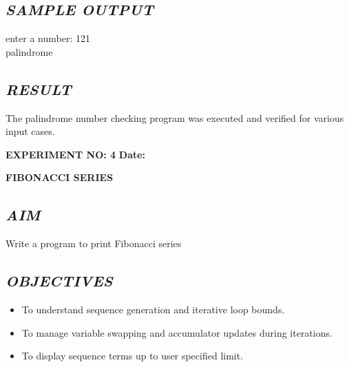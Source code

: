 \documentclass[11pt,a4paper]{article}
\begin{document}
\subsection*{\textit{SAMPLE OUTPUT}}
\begin{tcolorbox}[colback=black!85,colframe=navyblue,title=\textbf{Terminal Output},coltitle=white,fonttitle=\bfseries\small]
\small\ttfamily\color{green!30!white}
enter a number: 121\\
palindrome
\end{tcolorbox}

\subsection*{\textit{RESULT}}
The palindrome number checking program was executed and verified for various input cases.

\newpage

\noindent
\textbf{\large EXPERIMENT NO: 4} \hfill \textbf{\large Date: \underline{\hspace{3cm}}}

\vspace{0.2cm}
\begin{center}
{\Huge \textbf{\textcolor{navyblue}{FIBONACCI SERIES}}}
\end{center}
\vspace{0.3cm}

\subsection*{\textit{AIM}}
Write a program to print Fibonacci series

\subsection*{\textit{OBJECTIVES}}
\begin{itemize}
  \item To understand sequence generation and iterative loop bounds.
  \item To manage variable swapping and accumulator updates during iterations.
  \item To display sequence terms up to user specified limit.
\end{itemize}
\end{document}

